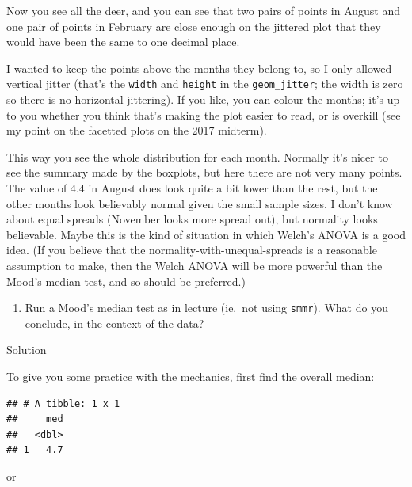\documentclass[]{tufte-book}
\newenvironment{Shaded}{}{}
\newcommand{\DataTypeTok}[1]{\textcolor[rgb]{0.56,0.13,0.00}{#1}}
\newcommand{\KeywordTok}[1]{\textcolor[rgb]{0.00,0.44,0.13}{\textbf{#1}}}
\newcommand{\NormalTok}[1]{#1}
\newcommand{\OperatorTok}[1]{\textcolor[rgb]{0.40,0.40,0.40}{#1}}
\newcommand{\StringTok}[1]{\textcolor[rgb]{0.25,0.44,0.63}{#1}}
\providecommand{\tightlist}{%
  \setlength{\itemsep}{0pt}\setlength{\parskip}{0pt}}
\theoremstyle{definition}
\theoremstyle{definition}
\theoremstyle{definition}
\theoremstyle{remark}
\begin{document}
Now you see all the deer, and you can see that two pairs of points in
August and one pair of points in February are close enough on the
jittered plot that they would have been the same to one decimal place.

I wanted to keep the points above the months they belong to, so I only
allowed vertical jitter (that's the \texttt{width} and \texttt{height}
in the \texttt{geom\_jitter}; the width is zero so there is no
horizontal jittering). If you like, you can colour the months; it's up
to you whether you think that's making the plot easier to read, or is
overkill (see my point on the facetted plots on the 2017 midterm).

This way you see the whole distribution for each month. Normally it's
nicer to see the summary made by the boxplots, but here there are not
very many points. The value of 4.4 in August does look quite a bit lower
than the rest, but the other months look believably normal given the
small sample sizes. I don't know about equal spreads (November looks
more spread out), but normality looks believable. Maybe this is the kind
of situation in which Welch's ANOVA is a good idea. (If you believe that
the normality-with-unequal-spreads is a reasonable assumption to make,
then the Welch ANOVA will be more powerful than the Mood's median test,
and so should be preferred.)

\begin{enumerate}
\def\labelenumi{(\alph{enumi})}
\setcounter{enumi}{2}
\tightlist
\item
  Run a Mood's median test as in lecture (ie.~not using \texttt{smmr}).
  What do you conclude, in the context of the data?
\end{enumerate}

Solution

To give you some practice with the mechanics, first find the overall
median:

\begin{Shaded}
\end{Shaded}

\begin{verbatim}
## # A tibble: 1 x 1
##     med
##   <dbl>
## 1   4.7
\end{verbatim}

or
\end{document}
